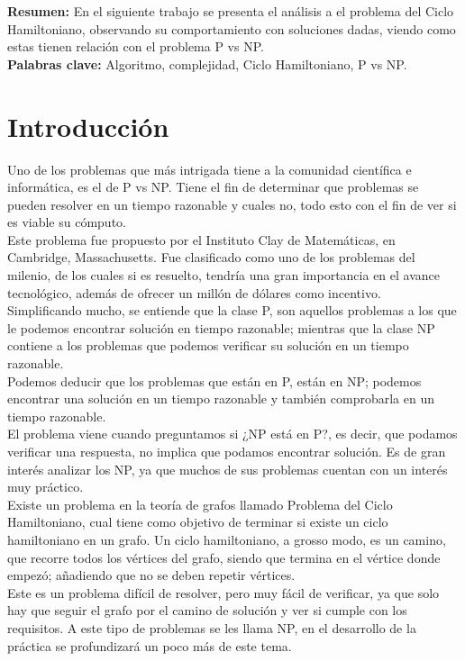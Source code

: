 \documentclass{article}
\begin{document}
    \textbf{Resumen: }
    En el siguiente trabajo se presenta el análisis a el problema del Ciclo Hamiltoniano, observando su comportamiento con soluciones dadas, viendo como estas tienen relación con el problema P vs NP. \\
    \textbf{Palabras clave: } Algoritmo, complejidad, Ciclo Hamiltoniano, P vs NP.
\section{Introducción}
    Uno de los problemas que más intrigada tiene a la comunidad científica e informática, es el de P vs NP. Tiene el fin de determinar que problemas se pueden resolver en un tiempo razonable y cuales no, todo esto con el fin de ver si es viable su cómputo. \\Este problema fue propuesto por el Instituto Clay de Matemáticas, en Cambridge, Massachusetts. Fue clasificado como uno de los problemas del milenio, de los cuales si es resuelto, tendría una gran importancia en el avance tecnológico, además de ofrecer un millón de dólares como incentivo.\\
    Simplificando mucho, se entiende que la clase P, son aquellos problemas a los que le podemos encontrar solución en tiempo razonable; mientras que la clase NP contiene a los problemas que podemos verificar su solución en un tiempo razonable.\\
    Podemos deducir que los problemas que están en P, están en NP; podemos encontrar una solución en un tiempo razonable y también comprobarla en un tiempo razonable.  \\El problema viene cuando preguntamos si ¿NP está en P?, es decir, que podamos verificar una respuesta, no implica que podamos encontrar solución.
    Es de gran interés analizar los NP, ya que muchos de sus problemas cuentan con un interés muy práctico.\\
    Existe un problema en la teoría de grafos llamado Problema del Ciclo Hamiltoniano, cual tiene como objetivo de terminar si existe un ciclo hamiltoniano en un grafo. Un ciclo hamiltoniano, a grosso modo, es un camino, que recorre todos los vértices del grafo, siendo que termina en el vértice donde empezó; añadiendo que no se deben repetir vértices.\\ Este es un problema difícil de resolver, pero muy fácil de verificar, ya que solo hay que seguir el grafo por el camino de solución y ver si cumple con los requisitos. A este tipo de problemas se les llama NP, en el desarrollo de la práctica se profundizará un poco más de este tema.
   
\end{document}
